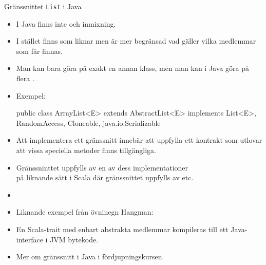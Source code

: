 \begin{Slide}{Gränssnittet \texttt{List} i Java}\SlideFontSmall
\begin{itemize}
\item I Java finns inte  och inmixning.

\item I stället finns  som liknar  men är mer begränsad vad gäller vilka medlemmar som får finnas.

\item Man kan bara göra  på exakt en annan klass, men man kan i Java göra  på flera .%

\item Exempel:
\begin{Code}[language=Java,backgroundcolor=\color{white},
  frame=none]
public class ArrayList<E> extends AbstractList<E>
    implements List<E>, RandomAccess, Cloneable, java.io.Serializable
\end{Code}

\item Att implementera ett gränssnitt innebär att uppfylla ett kontrakt som utlovar att vissa speciella metoder finns tillgängliga.

\item Gränssninttet  uppfylls av en av dess implementationer  \\

på liknande sätt i Scala där gränssnittet  uppfylls av  etc.

\item[] 

\item Liknande exempel från övninegn Hangman: \\

\item En Scala-trait med enbart abstrakta medlemmar kompileras till ett Java-interface i JVM bytekode.

\item Mer om gränssnitt i Java i fördjupningskursen.

\end{itemize}
\end{Slide}

